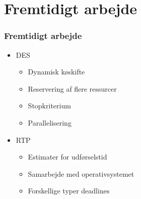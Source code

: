\documentclass[12pt]{beamer}
\begin{document}
\section{Fremtidigt arbejde}
\begin{frame}
  	\frametitle{Fremtidigt arbejde}
\begin{itemize}
\item DES
	\begin{itemize}
	\item Dynamisk køskifte
	\item Reservering af flere ressurcer
	\item Stopkriterium
	\item Parallelisering
	\end{itemize}
\item RTP
	\begin{itemize}
	\item Estimater for udførselstid
	\item Samarbejde med operativsystemet
	\item Forskellige typer deadlines
	\end{itemize}
\end{itemize}
\end{frame}






\end{document}
